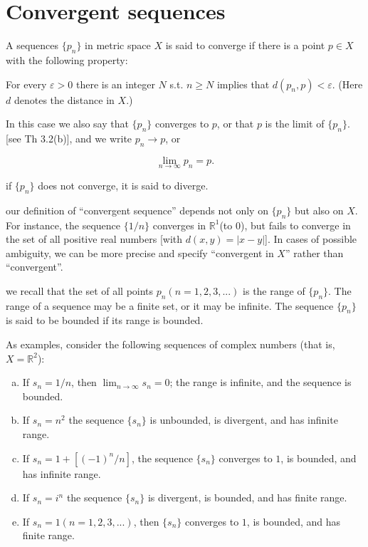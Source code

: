 \section{Convergent sequences}

\begin{myDef}\label{myDef:3.1}
    A sequences 
    $\{p_n\}$ 
    in metric space $X$ is said to converge if there is a point $p \in X$ with the following property:
    
    For every $\varepsilon >0$ there is an integer $N$ s.t. $n \geq N$ implies that $d(p_n, p) < \varepsilon$. (Here $d$ denotes the distance in $X$.)

    In this case we also say that $\{p_n\}$ converges to $p$, or that $p$ is the limit of $\{p_n\}$. [see Th 3.2(b)], and we write $p_n \rightarrow p$, or

    \begin{equation*}
        \lim_{n \to \infty} p_n = p.
    \end{equation*}

    if $\{p_n\}$ does not converge, it is said to diverge.
\end{myDef}

our definition of ``convergent sequence'' depends not only on $\{p_n\}$ but also on $X$. For instance, the sequence $\{1/n\}$ converges in $\mathbb{R}^1$(to $0$), but fails to converge in the set of all positive real numbers [with $d(x,y) = |x-y|$]. 
In cases of possible ambiguity, we can be more
precise and specify ``convergent in $X$'' rather than ``convergent''.

we recall that the set of all points $p_n (n=1,2, 3,...)$ is the range of 
$\{p_n\}$.
The range of a sequence may be a finite set, or it may be infinite. The sequence
$\{p_n\}$ is said to be bounded if its range is bounded.

As examples, consider the following sequences of complex numbers
(that is, $X = \mathbb{R}^2$):

\begin{enumerate}[(a)]
    \item If $s_n=1/n$, then $\lim_{n \to \infty} s_n = 0$; the range is infinite, and the sequence is bounded.
    \item If $s_n=n^2$ the sequence $\{s_n\}$ is unbounded, is divergent, and has infinite range.
    \item If $s_n = 1+[(- 1)^n/n]$, the sequence $\{s_n\}$ converges to $1$, is bounded, and has infinite range.
    \item If $s_n =i^n$ the sequence $\{s_n\}$ is divergent, is bounded, and has finite range.
    \item If $s_n = 1(n=1,2,3,...)$, then $\{s_n\}$ converges to $1$, is bounded, and has finite range.
\end{enumerate}


